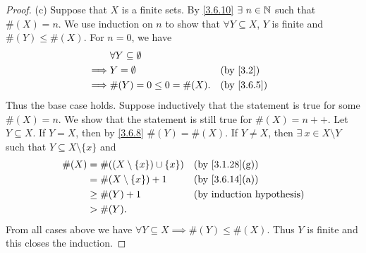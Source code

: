 \begin{proof}{(c)}
  Suppose that \(X\) is a finite sets.
  By \cref{3.6.10} \(\exists\ n \in \N\) such that \(\#(X) = n\).
  We use induction on \(n\) to show that \(\forall Y \subseteq X\), \(Y\) is finite and \(\#(Y) \leq \#(X)\).
  For \(n = 0\), we have
  \begin{align*}
             & \forall Y \subseteq \emptyset                             \\
    \implies & Y = \emptyset                 &  & \text{(by \cref{3.2})} \\
    \implies & \#(Y) = 0 \leq 0 = \#(X).     &  & \by{3.6.5}
  \end{align*}
  Thus the base case holds.
  Suppose inductively that the statement is true for some \(\#(X) = n\).
  We show that the statement is still true for \(\#(X) = n++\).
  Let \(Y \subseteq X\).
  If \(Y = X\), then by \cref{3.6.8} \(\#(Y) = \#(X)\).
  If \(Y \neq X\), then \(\exists\ x \in X \setminus Y\) such that \(Y \subseteq X \setminus \{x\}\) and
  \begin{align*}
    \#(X) & = \#((X \setminus \{x\}) \cup \{x\}) &  & \text{(by \cref{3.1.28}(g))} \\
          & = \#(X \setminus \{x\}) + 1          &  & \text{(by \cref{3.6.14}(a))} \\
          & \geq \#(Y) + 1                       &  & \byIH                        \\
          & > \#(Y).
  \end{align*}
  From all cases above we have \(\forall Y \subseteq X \implies \#(Y) \leq \#(X)\).
  Thus \(Y\) is finite and this closes the induction.


\end{proof}
